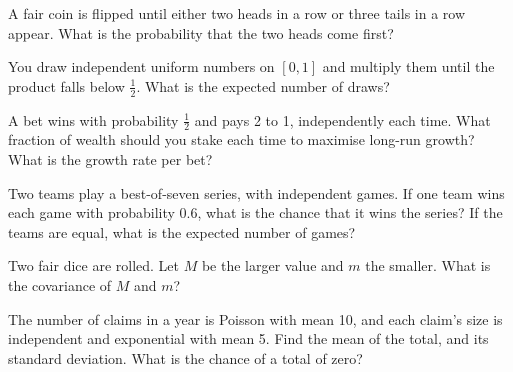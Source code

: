 
\begin{question}\label{iq:iv1:timed-test-4:7}
A fair coin is flipped until either two heads in a row or three tails in a row appear. What is the probability that the two heads come first?
\end{question}

\begin{question}\label{iq:iv1:timed-test-4:8}
You draw independent uniform numbers on $[0, 1]$ and multiply them until the product falls below $\frac12$. What is the expected number of draws?
\end{question}

\begin{question}\label{iq:iv1:timed-test-4:9}
A bet wins with probability $\frac12$ and pays 2 to 1, independently each time. What fraction of wealth should you stake each time to maximise long-run growth? What is the growth rate per bet?
\end{question}

\begin{question}\label{iq:iv1:timed-test-4:10}
Two teams play a best-of-seven series, with independent games. If one team wins each game with probability $0.6$, what is the chance that it wins the series? If the teams are equal, what is the expected number of games?
\end{question}

\begin{question}\label{iq:iv1:timed-test-4:11}
Two fair dice are rolled. Let $M$ be the larger value and $m$ the smaller. What is the covariance of $M$ and $m$?
\end{question}

\begin{question}\label{iq:iv1:timed-test-4:12}
The number of claims in a year is Poisson with mean 10, and each claim's size is independent and exponential with mean 5. Find the mean of the total, and its standard deviation. What is the chance of a total of zero?
\end{question}
